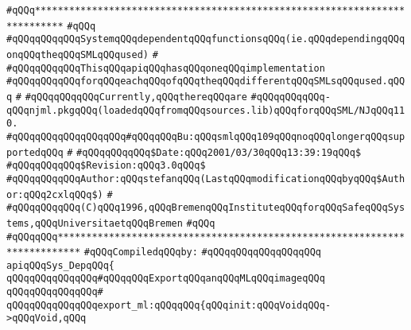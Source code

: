 \label{src/lib/tk/src/sys_dep.api}
\verb|#qQQq***************************************************************************|\newline
\verb|#qQQq|\newline
\verb|#qQQqqQQqqQQqSystemqQQqdependentqQQqfunctionsqQQq(ie.qQQqdependingqQQqonqQQqtheqQQqSMLqQQqused)|\newline
\verb|#|\newline
\verb|#qQQqqQQqqQQqThisqQQqapiqQQqhasqQQqoneqQQqimplementation|\newline
\verb|#qQQqqQQqqQQqforqQQqeachqQQqofqQQqtheqQQqdifferentqQQqSMLsqQQqused.qQQq|\newline
\verb|#|\newline
\verb|#qQQqqQQqqQQqCurrently,qQQqthereqQQqare|\newline
\verb|#qQQqqQQqqQQq-qQQqnjml.pkgqQQq(loadedqQQqfromqQQqsources.lib)qQQqforqQQqSML/NJqQQq110.|\newline
\verb|#qQQqqQQqqQQqqQQqqQQq#qQQqqQQqBu:qQQqsmlqQQq109qQQqnoqQQqlongerqQQqsupportedqQQq|\newline
\verb|#|\newline
\verb|#qQQqqQQqqQQq$Date:qQQq2001/03/30qQQq13:39:19qQQq$|\newline
\verb|#qQQqqQQqqQQq$Revision:qQQq3.0qQQq$|\newline
\verb|#qQQqqQQqqQQqAuthor:qQQqstefanqQQq(LastqQQqmodificationqQQqbyqQQq$Author:qQQq2cxlqQQq$)|\newline
\verb|#|\newline
\verb|#qQQqqQQqqQQq(C)qQQq1996,qQQqBremenqQQqInstituteqQQqforqQQqSafeqQQqSystems,qQQqUniversitaetqQQqBremen|\newline
\verb|#qQQq|\newline
\verb|#qQQqqQQq**************************************************************************|\newline
\newline
\verb|#qQQqCompiledqQQqby:|\newline
\verb|#qQQqqQQqqQQqqQQqqQQq|\newline
\newline
\verb|apiqQQqSys_DepqQQq{|\newline
\newline
\verb|qQQqqQQqqQQqqQQq#qQQqqQQqExportqQQqanqQQqMLqQQqimageqQQq|\newline
\verb|qQQqqQQqqQQqqQQq#|\newline
\verb|qQQqqQQqqQQqqQQqexport_ml:qQQqqQQq{qQQqinit:qQQqVoidqQQq->qQQqVoid,qQQq|\newline
